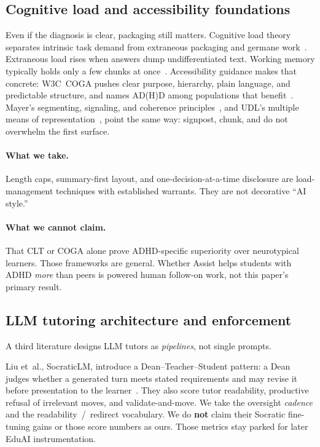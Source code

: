 \subsection{Cognitive load and accessibility foundations}

Even if the diagnosis is clear, packaging still matters. Cognitive load theory
separates intrinsic task demand from extraneous packaging and germane
work~\cite{sweller2011cognitive}. Extraneous load rises when answers dump
undifferentiated text. Working memory typically holds only a few chunks at
once~\cite{cowan2010magical}. Accessibility guidance makes that concrete:
W3C~COGA pushes clear purpose, hierarchy, plain language, and predictable
structure, and names AD(H)D among populations that
benefit~\cite{w3c2021coga}. Mayer's segmenting, signaling, and coherence
principles~\cite{mayer2021multimedia}, and UDL's multiple means of
representation~\cite{cast2018udl}, point the same way: signpost, chunk, and do
not overwhelm the first surface.

\paragraph{What we take.}
Length caps, summary-first layout, and one-decision-at-a-time disclosure are
load-management techniques with established warrants. They are not decorative
``AI style.''
\paragraph{What we cannot claim.}
That CLT or COGA alone prove ADHD-specific superiority over neurotypical
learners. Those frameworks are general. Whether Assist helps students with
ADHD \emph{more} than peers is powered human follow-on work, not this paper's
primary result.

\subsection{LLM tutoring architecture and enforcement}

A third literature designs LLM tutors as \emph{pipelines}, not single prompts.

Liu et~al., SocraticLM, introduce a Dean--Teacher--Student pattern: a Dean
judges whether a generated turn meets stated requirements and may revise it
before presentation to the learner~\cite{liu2024socraticlm}. They also score
tutor readability, productive refusal of irrelevant moves, and
validate-and-move. We take the oversight \emph{cadence} and the
readability~/~redirect vocabulary. We do \textbf{not} claim their Socratic
fine-tuning gains or those score numbers as ours. Those metrics stay parked
for later EduAI instrumentation.

